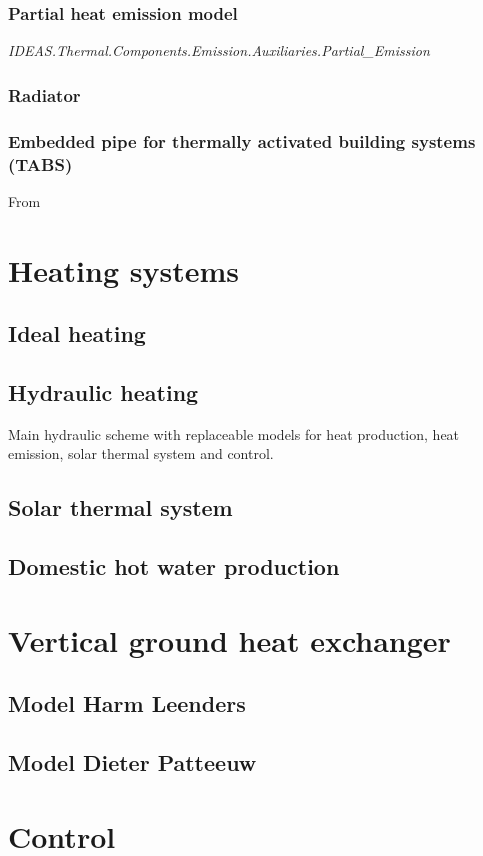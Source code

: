 \subsubsection{Partial heat emission model}

\emph{IDEAS.Thermal.Components.Emission.Auxiliaries.Partial_Emission}
\vspace{6mm}

\subsubsection{Radiator}

\subsubsection{Embedded pipe for thermally activated building systems (TABS)}

From ~\cite{Koschenz2000}

\section{Heating systems}

\subsection{Ideal heating}

\subsection{Hydraulic heating}

Main hydraulic scheme with replaceable models for heat production, heat emission, solar thermal system and control.

\subsection{Solar thermal system}

\subsection{Domestic hot water production}

\section{Vertical ground heat exchanger}

\subsection{Model Harm Leenders}

\subsection{Model Dieter Patteeuw}

\section{Control}


%









